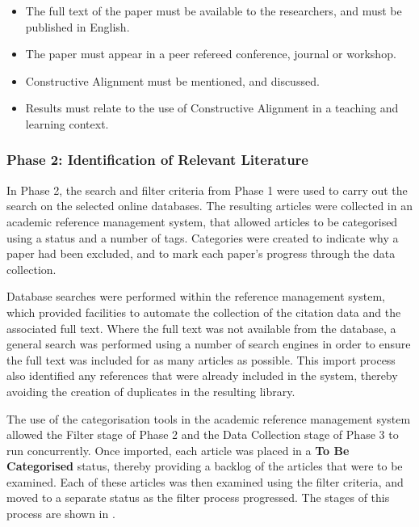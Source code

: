 \begin{itemize}[noitemsep,nolistsep]
	\item The full text of the paper must be available to the researchers, and must be published in English.
	\item The paper must appear in a peer refereed conference, journal or workshop.
	\item Constructive Alignment must be mentioned, and discussed.
	\item Results must relate to the use of Constructive Alignment in a teaching and learning context.
\end{itemize}


\subsubsection{Phase 2: Identification of Relevant Literature} %
\label{ssub:identification_of_relevant_literature}

In Phase 2, the search and filter criteria from Phase 1 were used to carry out the search on the selected online databases. The resulting articles were collected in an academic reference management system, that allowed articles to be categorised using a status and a number of tags. Categories were created to indicate why a paper had been excluded, and to mark each paper's progress through the data collection. 

Database searches were performed within the reference management system, which provided facilities to automate the collection of the citation data and the associated full text. Where the full text was not available from the database, a general search was performed using a number of search engines in order to ensure the full text was included for as many articles as possible. This import process also identified any references that were already included in the system, thereby avoiding the creation of duplicates in the resulting library.

The use of the categorisation tools in the academic reference management system allowed the Filter stage of Phase 2 and the Data Collection stage of Phase 3 to run concurrently. Once imported, each article was placed in a \textbf{To Be Categorised} status, thereby providing a backlog of the articles that were to be examined. Each of these articles was then examined using the filter criteria, and moved to a separate status as the filter process progressed. The stages of this process are shown in .

